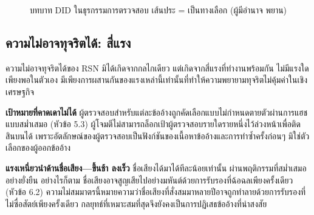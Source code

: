 \documentclass[11pt,a4paper,twocolumn]{article}
\begin{document}
\begin{figure}[ht]
\centering
{}
\caption{บทบาท DID ในธุรกรรมการตรวจสอบ เส้นประ = เป็นทางเลือก (ผู้มีอำนาจ พยาน)}
\label{fig:roles}
\end{figure}

\subsection{ความไม่อาจทุจริตได้: สี่แรง}

ความไม่อาจทุจริตได้ของ RSN มิได้เกิดจากกลไกเดียว แต่เกิดจากสี่แรงที่ทำงานพร้อมกัน ไม่มีแรงใดเพียงพอในตัวเอง มีเพียงการผสานกันของแรงเหล่านี้เท่านั้นที่ทำให้ความพยายามทุจริตไม่คุ้มค่าในเชิงเศรษฐกิจ

\textbf{เป้าหมายที่คาดเดาไม่ได้} ผู้ตรวจสอบสำหรับแต่ละข้ออ้างถูกคัดเลือกแบบไม่กำหนดตายตัวผ่านการแฮชแบบสม่ำเสมอ (หัวข้อ 5.3) ผู้โจมตีไม่สามารถล็อกเป้าผู้ตรวจสอบรายใดรายหนึ่งไว้ล่วงหน้าเพื่อติดสินบนได้ เพราะอัตลักษณ์ของผู้ตรวจสอบเป็นฟังก์ชันของเนื้อหาข้ออ้างและการทำซ้ำครั้งก่อนๆ มิใช่ตัวเลือกของผู้ออกข้ออ้าง

\textbf{แรงเหนี่ยวนำด้านชื่อเสียง---ขึ้นช้า ลงเร็ว} ชื่อเสียงได้มาได้ทีละน้อยเท่านั้น ผ่านพฤติกรรมที่สม่ำเสมออย่างยั่งยืน อย่างไรก็ตาม ชื่อเสียงอาจสูญเสียไปอย่างมหันต์ด้วยการรับรองที่ฉ้อฉลเพียงครั้งเดียว (หัวข้อ 6.2) ความไม่สมมาตรนี้หมายความว่าชื่อเสียงที่สั่งสมมาหลายปีอาจถูกทำลายด้วยการรับรองที่ไม่ซื่อสัตย์เพียงครั้งเดียว กลยุทธ์ที่เหมาะสมที่สุดจึงยังคงเป็นการปฏิเสธข้ออ้างที่น่าสงสัย
\end{document}
